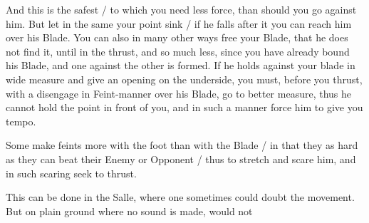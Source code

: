 And this is the safest / to which you need less force, than should you
go against him. But let in the same your point sink / if he falls
after it you can reach him over his Blade. You can also in many other
ways free your Blade, that he does not find it, until in the thrust,
and so much less, since you have already bound his Blade, and one
against the other is formed. If he holds against your blade in wide
measure and give an opening on the underside, you must, before you
thrust, with a disengage in Feint-manner over his Blade, go to better
measure, thus he cannot hold the point in front of you, and in such a
manner force him to give you tempo.



Some make feints more with the foot than with the Blade / in that they
as hard as they can beat their Enemy or Opponent / thus to stretch and
scare him, and in such scaring seek to thrust.


This can be done in the Salle, where one sometimes could doubt the
movement. But on plain ground where no sound is made, would not
